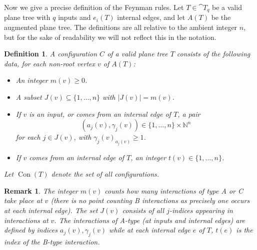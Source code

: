 \documentclass[english,letter paper,12pt,leqno]{article}
\theoremstyle{example}
\newtheorem{definition}[theorem]{Definition}
\newtheorem{remark}[theorem]{Remark}
\numberwithin{equation}{section}
\begin{document}
Now we give a precise definition of the Feynman rules. Let $T \in \cat{T}_q$ be a valid plane tree with $q$ inputs and $e_i(T)$ internal edges, and let $A(T)$ be the augmented plane tree. The definitions are all relative to the ambient integer $n$, but for the sake of readability we will not reflect this in the notation.

\begin{definition}\label{defn:config} A \emph{configuration} $C$ of a valid plane tree $T$ consists of the following data, for each non-root vertex $v$ of $A(T)$:
\begin{itemize}
\item An integer $m(v) \ge 0$.
\item A subset $J(v) \subseteq \{ 1,\ldots, n \}$ with $|J(v)| = m(v)$. 
\item If $v$ is an input, or comes from an internal edge of $T$, a pair
\[
( a_j(v), \gamma_j(v) ) \in \{ 1, \ldots, n \} \times \mathbb{N}^n
\]
for each $j \in J(v)$, with $\gamma_j(v)_{a_j(v)} \ge 1$.
\item If $v$ comes from an internal edge of $T$, an integer $t(v) \in \{1,\ldots,n\}$.
\end{itemize}
Let $\operatorname{Con}(T)$ denote the set of all configurations.
\end{definition} 

\begin{remark} The integer $m(v)$ counts how many interactions of type A or C take place at $v$ (there is no point counting B interactions as precisely one occurs at each internal edge). The set $J(v)$ consists of all $j$-indices appearing in interactions at $v$. The interactions of A-type (at inputs and internal edges) are defined by indices $a_j(v), \gamma_j(v)$ while at each internal edge $e$ of $T$, $t(e)$ is the index of the B-type interaction.
\end{remark}
\end{document}
